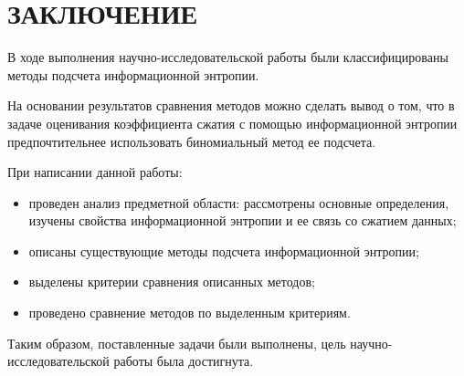 \chapter*{ЗАКЛЮЧЕНИЕ}

В ходе выполнения научно-исследовательской работы были классифицированы методы подсчета информационной энтропии.

На основании результатов сравнения методов можно сделать вывод о том, что в задаче оценивания коэффициента сжатия с помощью информационной энтропии предпочтительнее использовать биномиальный метод ее подсчета.

При написании данной работы:

\begin{itemize}
	\item проведен анализ предметной области: рассмотрены основные определения, изучены свойства информационной энтропии и ее связь со сжатием данных;
	\item описаны существующие методы подсчета информационной энтропии;
	\item выделены критерии сравнения описанных методов;
	\item проведено сравнение методов по выделенным критериям.
\end{itemize}

Таким образом, поставленные задачи были выполнены, цель научно-исследовательской работы была достигнута.